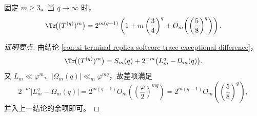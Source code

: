 \begin{conclusion}[全迹矩的同阶主导渐近]\label{con:xi-terminal-replica-softcore-trace-moments-exponential-hierarchy}
固定 \(m\ge3\)。当 \(q\to\infty\) 时，
\[
\Tr\!\bigl((T^{(q)})^m\bigr)
=2^{m(q-1)}\left(1+m\left(\frac34\right)^q+O_m\!\left(\left(\frac58\right)^q\right)\right).
\]
\end{conclusion}
\begin{proof}[证明要点]
由结论 \ref{con:xi-terminal-replica-softcore-trace-exceptional-difference}，
\[
\Tr\!\bigl((T^{(q)})^m\bigr)
=S_m(q)+2^{-m}\bigl(L_m^q-\Omega_m(q)\bigr).
\]
又 \(L_m\ll \varphi^m\)、\(|\Omega_m(q)|\ll_m\varphi^{mq}\)，故差项满足
\[
2^{-m}\bigl|L_m^q-\Omega_m(q)\bigr|
=2^{m(q-1)}O_m\!\left(\left(\frac{\varphi}{2}\right)^{mq}\right)
=2^{m(q-1)}O_m\!\left(\left(\frac58\right)^q\right),
\]
并入上一结论的余项即可。
\end{proof}

\endinput
